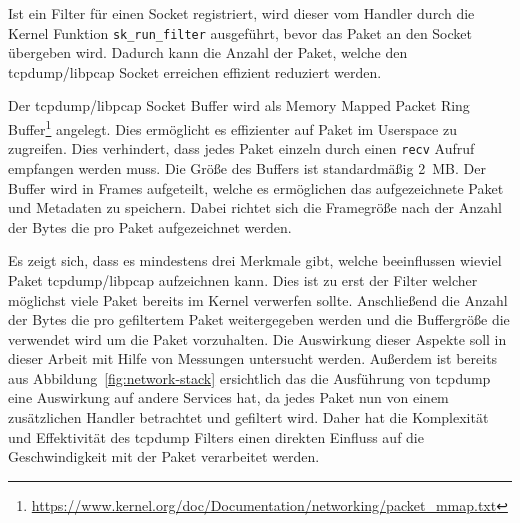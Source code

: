 Ist ein Filter für einen Socket registriert, wird dieser vom Handler durch die Kernel
Funktion \texttt{sk\_run\_filter} ausgeführt, bevor
das Paket an den Socket übergeben wird. Dadurch kann die Anzahl der Paket,
welche den tcpdump/libpcap Socket erreichen effizient reduziert werden.

Der tcpdump/libpcap Socket Buffer wird als Memory Mapped Packet Ring
Buffer\footnote{\url{https://www.kernel.org/doc/Documentation/networking/packet_mmap.txt}}
angelegt. Dies ermöglicht es effizienter auf Paket im Userspace zu zugreifen.
Dies verhindert, dass jedes Paket einzeln durch einen \texttt{recv} Aufruf
empfangen werden muss.  Die Größe des Buffers ist standardmäßig 2~MB\@. Der
Buffer wird in Frames aufgeteilt, welche es ermöglichen das aufgezeichnete
Paket und Metadaten zu speichern. Dabei richtet sich die Framegröße nach der
Anzahl der Bytes die pro Paket aufgezeichnet werden.

Es zeigt sich, dass es mindestens drei Merkmale gibt, welche beeinflussen wieviel
Paket tcpdump/libpcap aufzeichnen kann. Dies ist zu erst der Filter welcher
möglichst viele Paket bereits im Kernel verwerfen sollte. Anschließend die
Anzahl der Bytes die pro gefiltertem Paket weitergegeben werden und die
Buffergröße die verwendet wird um die Paket vorzuhalten. Die Auswirkung
dieser Aspekte soll in dieser Arbeit mit Hilfe von Messungen untersucht werden.
Außerdem ist bereits aus Abbildung~\ref{fig:network-stack} ersichtlich das die
Ausführung von tcpdump eine Auswirkung auf andere Services hat, da jedes Paket
nun von einem zusätzlichen Handler betrachtet und gefiltert wird. Daher hat die
Komplexität und Effektivität des tcpdump Filters einen direkten Einfluss auf
die Geschwindigkeit mit der Paket verarbeitet werden.
